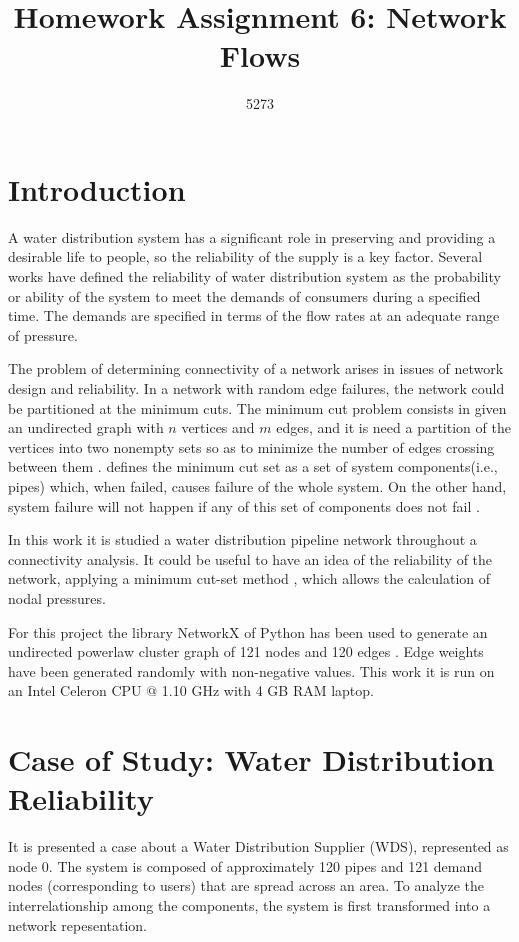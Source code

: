 \documentclass[10pt,a4paper,openany]{article}
\author{5273}
\title{Homework Assignment 6: Network Flows}
\date{}
\begin{document}
	
\maketitle

	\section*{Introduction}
	
	A water distribution system has a significant role in preserving and providing a desirable life to people, so the reliability of the supply is a key factor. Several works have defined the reliability of water distribution system \citep{kaufmann1977mathematical,goulter1995analytical,cullinane1992optimization} as the probability or ability of the system to meet the demands of consumers during a specified time. The demands are specified in terms of the flow rates at an adequate range of pressure.
	
	The problem of determining connectivity of a network arises in issues of network design and reliability. In a network with random edge failures, the network could be partitioned at the minimum cuts. The minimum cut problem consists in given an undirected graph with $ n $ vertices and $ m $ edges, and it is need a partition of the vertices into two nonempty sets so as to minimize the number of edges crossing between them \citep{karger1996new}. \citet{su1987reliability} defines the minimum cut set as a set of system components(i.e., pipes) which, when failed, causes failure of the whole system. On the other hand, system failure will not happen if any of this set of components does not fail \citep{billinton1992reliability}.
	 
	In this work it is studied a water distribution pipeline network throughout a connectivity analysis. It could be useful to have an idea of the reliability of the network, applying a minimum cut-set method \citep{al2005evaluation}, which allows the calculation of nodal pressures.
	
	For this project the library NetworkX of Python has been used to generate an undirected powerlaw cluster graph of 121 nodes and 120 edges \citep{networkx}. Edge weights have been generated randomly with non-negative values. This work it is run on an Intel Celeron CPU $ @ $ 1.10 GHz with 4 GB RAM laptop.
	
	\section*{Case of Study: Water Distribution Reliability}
	It is presented a case about a Water Distribution Supplier (WDS), represented as node 0. The  system is composed of approximately 120 pipes and 121 demand  nodes (corresponding to users) that are spread across an area. To analyze the interrelationship among the components, the system is first transformed into a network repesentation.
	
\end{document}
